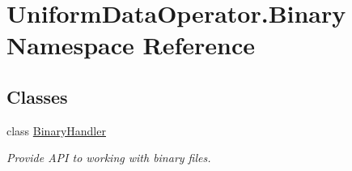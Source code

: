 \hypertarget{namespace_uniform_data_operator_1_1_binary}{}\section{Uniform\+Data\+Operator.\+Binary Namespace Reference}
\label{namespace_uniform_data_operator_1_1_binary}
\subsection*{Classes}
\begin{DoxyCompactItemize}
\item 
class \mbox{\hyperlink{class_uniform_data_operator_1_1_binary_1_1_binary_handler}{Binary\+Handler}}
\begin{DoxyCompactList}\small\item\em Provide A\+PI to working with binary files. \end{DoxyCompactList}\end{DoxyCompactItemize}
